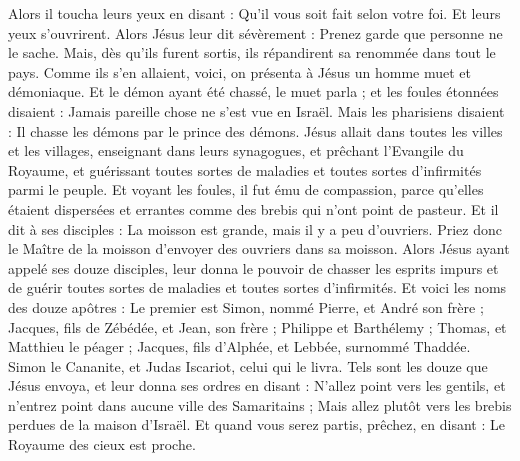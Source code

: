 \begin{multicols}{2}
{Alors il toucha leurs yeux en disant : Qu'il vous soit fait selon votre foi.
Et leurs yeux s’ouvrirent. Alors Jésus leur dit sévèrement : Prenez garde que personne ne le sache.
Mais, dès qu’ils furent sortis, ils répandirent sa renommée dans tout le pays.
Comme ils s’en allaient, voici, on présenta à Jésus un homme muet et démoniaque.
Et le démon ayant été chassé, le muet parla ; et les foules étonnées disaient : Jamais pareille chose ne s’est vue en Israël.
Mais les pharisiens disaient : Il chasse les démons par le prince des démons.
Jésus allait dans toutes les villes et les villages, enseignant dans leurs synagogues, et prêchant l'Evangile du Royaume, et guérissant toutes sortes de maladies et toutes sortes d'infirmités parmi le peuple.
Et voyant les foules, il fut ému de compassion, parce qu'elles étaient dispersées et errantes comme des brebis qui n'ont point de pasteur.
Et il dit à ses disciples : La moisson est grande, mais il y a peu d'ouvriers.
Priez donc le Maître de la moisson d’envoyer des ouvriers dans sa moisson.
\VerseOne{}Alors Jésus ayant appelé ses douze disciples, leur donna le pouvoir de chasser les esprits impurs et de guérir toutes sortes de maladies et toutes sortes d'infirmités.
Et voici les noms des douze apôtres : Le premier est Simon, nommé Pierre, et André son frère ; Jacques, fils de Zébédée, et Jean, son frère ;
Philippe et Barthélemy ; Thomas, et Matthieu le péager ; Jacques, fils d'Alphée, et Lebbée, surnommé Thaddée.
Simon le Cananite, et Judas Iscariot, celui qui le livra.
Tels sont les douze que Jésus envoya, et leur donna ses ordres en disant : N'allez point vers les gentils, et n'entrez point dans aucune ville des Samaritains ;
Mais allez plutôt vers les brebis perdues de la maison d'Israël.
Et quand vous serez partis, prêchez, en disant : Le Royaume des cieux est proche.
}
\end{multicols}

